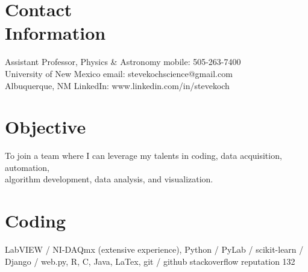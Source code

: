 \documentclass[margin,line]{resume}
\begin{document}
\begin{resume}

    \section{\mysidestyle Contact\\Information}

    Assistant Professor, Physics \& Astronomy                \hfill mobile: 505-263-7400          \vspace{0mm}\\\vspace{0mm}%
    University of New Mexico                                \hfill email: stevekochscience@gmail.com          \vspace{0mm}\\\vspace{0mm}%
    Albuquerque, NM                                         \hfill LinkedIn: www.linkedin.com/in/stevekoch  \vspace{0mm}\\\vspace{-4.5mm}%


    \section{\mysidestyle Objective}

    To join a team where I can leverage my talents in coding, data acquisition, automation, \\ 
    algorithm development, data analysis, and visualization.

    \section{\mysidestyle Coding} 

    LabVIEW / NI-DAQmx (extensive experience), Python / PyLab / scikit-learn / Django / web.py, R, C, Java, LaTex, git / github \newline stackoverflow reputation 132


\end{resume}
\end{document}

